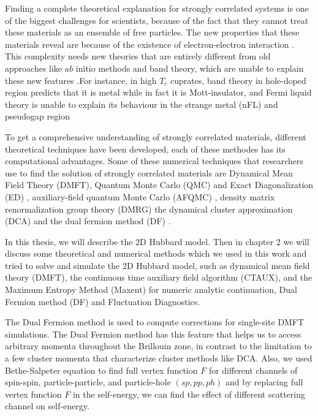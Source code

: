 Finding a complete theoretical explanation for strongly correlated systems is one of the biggest challenges for scientists, because of the fact that they cannot treat these materials as an ensemble of free particles. The new properties that these materials reveal are because of the existence of electron-electron interaction \cite{Elbio}. This complexity needs new theories that are entirely different from old approaches like $ab$ initio methods and band theory, which are unable to explain these new features \cite{Gabriel}.For instance, in high $T_c$ cuprates, band theory in hole-doped region predicts that it is metal while in fact it is Mott-insulator, and Fermi liquid theory is unable to explain its behaviour in the strange metal (nFL) and pseudogap region \cite{Patrick, Patrick1}

To get a comprehensive understanding of strongly correlated materials, different theoretical techniques have been developed, each of these methodes has its computational advantages. Some of these numerical techniques that researchers use to find the solution of strongly correlated materials are Dynamical Mean Field Theory (DMFT), Quantum Monte Carlo (QMC) and Exact Diagonalization (ED) \cite{Gabriel, Loh}, auxiliary-field quantum Monte Carlo
(AFQMC) \cite{Hao}, density matrix renormalization group theory (DMRG) \cite{Schollwock} the dynamical cluster approximation (DCA) \cite{Thomas} and the dual fermion method (DF) \cite{Rubtsov}.

In this thesis, we will describe the 2D Hubbard model. Then in chapter 2 we will discuss some theoretical and numerical methods which we used in this work and tried to solve and simulate the 2D Hubbard model, such as dynamical mean field theory (DMFT), the continuous time auxiliary field algorithm (CTAUX), and the Maximum Entropy Method (Maxent) for numeric analytic continuation, Dual Fermion method (DF) and Fluctuation Diagnostics. 

The Dual Fermion method is used to compute corrections for single-site DMFT simulations. The Dual Fermion method has this feature that helps us to access arbitrary momenta throughout the Brillouin zone, in contrast to the limitation to a few cluster momenta that characterize cluster methods like DCA. Also, we used Bethe-Salpeter equation to find full vertex function $F$ for different channels of spin-spin, particle-particle, and particle-hole $(sp, pp, ph)$ and by replacing full vertex function $F$ in the self-energy, we can find the effect of different scattering channel on self-energy. 

